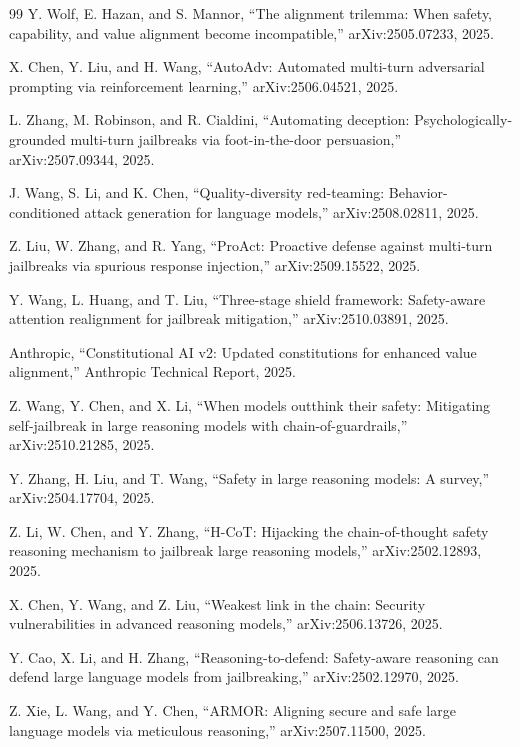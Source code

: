 \documentclass[11pt,a4paper]{article}
\begin{document}
\begin{thebibliography}{99}
Y. Wolf, E. Hazan, and S. Mannor, ``The alignment trilemma: When safety, capability, and value alignment become incompatible,'' arXiv:2505.07233, 2025.

X. Chen, Y. Liu, and H. Wang, ``AutoAdv: Automated multi-turn adversarial prompting via reinforcement learning,'' arXiv:2506.04521, 2025.

L. Zhang, M. Robinson, and R. Cialdini, ``Automating deception: Psychologically-grounded multi-turn jailbreaks via foot-in-the-door persuasion,'' arXiv:2507.09344, 2025.

J. Wang, S. Li, and K. Chen, ``Quality-diversity red-teaming: Behavior-conditioned attack generation for language models,'' arXiv:2508.02811, 2025.

Z. Liu, W. Zhang, and R. Yang, ``ProAct: Proactive defense against multi-turn jailbreaks via spurious response injection,'' arXiv:2509.15522, 2025.

Y. Wang, L. Huang, and T. Liu, ``Three-stage shield framework: Safety-aware attention realignment for jailbreak mitigation,'' arXiv:2510.03891, 2025.

Anthropic, ``Constitutional AI v2: Updated constitutions for enhanced value alignment,'' Anthropic Technical Report, 2025.

Z. Wang, Y. Chen, and X. Li, ``When models outthink their safety: Mitigating self-jailbreak in large reasoning models with chain-of-guardrails,'' arXiv:2510.21285, 2025.

Y. Zhang, H. Liu, and T. Wang, ``Safety in large reasoning models: A survey,'' arXiv:2504.17704, 2025.

Z. Li, W. Chen, and Y. Zhang, ``H-CoT: Hijacking the chain-of-thought safety reasoning mechanism to jailbreak large reasoning models,'' arXiv:2502.12893, 2025.

X. Chen, Y. Wang, and Z. Liu, ``Weakest link in the chain: Security vulnerabilities in advanced reasoning models,'' arXiv:2506.13726, 2025.

Y. Cao, X. Li, and H. Zhang, ``Reasoning-to-defend: Safety-aware reasoning can defend large language models from jailbreaking,'' arXiv:2502.12970, 2025.

Z. Xie, L. Wang, and Y. Chen, ``ARMOR: Aligning secure and safe large language models via meticulous reasoning,'' arXiv:2507.11500, 2025.

\end{thebibliography}
\end{document}
